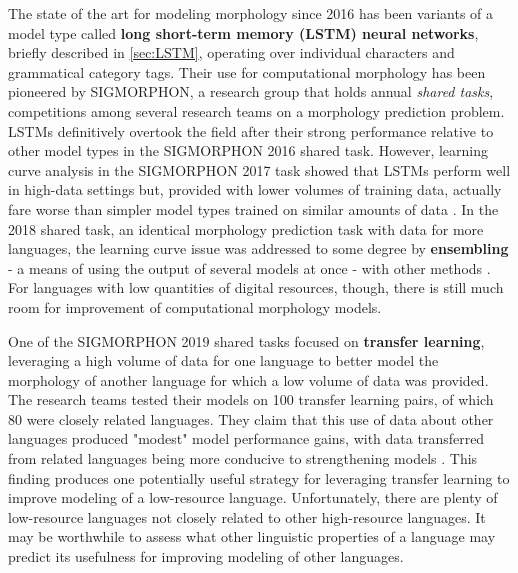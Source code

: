 The state of the art for modeling morphology since 2016 has been variants of a model type called \textbf{long short-term memory (LSTM) neural networks}, briefly described in \ref{sec:LSTM}, operating over individual characters and grammatical category tags. Their use for computational morphology has been pioneered by SIGMORPHON, a research group that holds annual \textit{shared tasks}, competitions among several research teams on a morphology prediction problem. LSTMs definitively overtook the field after their strong performance relative to other model types in the SIGMORPHON 2016 shared task. However, learning curve analysis in the SIGMORPHON 2017 task showed that LSTMs perform well in high-data settings but, provided with lower volumes of training data, actually fare worse than simpler model types trained on similar amounts of data \parencite{Cotterell2017a}. In the 2018 shared task, an identical morphology prediction task with data for more languages, the learning curve issue was addressed to some degree by \textbf{ensembling} - a means of using the output of several models at once - with other methods \parencite{Cotterell2018b}. For languages with low quantities of digital resources, though, there is still much room for improvement of computational morphology models.

One of the SIGMORPHON 2019 shared tasks focused on \textbf{transfer learning}, leveraging a high volume of data for one language to better model the morphology of another language for which a low volume of data was provided. The research teams tested their models on 100 transfer learning pairs, of which 80 were closely related languages. They claim that this use of data about other languages produced "modest" model performance gains, with data transferred from related languages being more conducive to strengthening models \parencite{McCarthy2019}. This finding produces one potentially useful strategy for leveraging transfer learning to improve modeling of a low-resource language. Unfortunately, there are plenty of low-resource languages not closely related to other high-resource languages. It may be worthwhile to assess what other linguistic properties of a language may predict its usefulness for improving modeling of other languages. 


